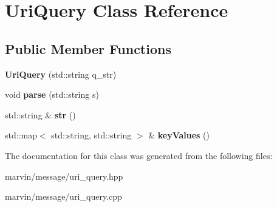 \hypertarget{class_uri_query}{}\section{Uri\+Query Class Reference}
\label{class_uri_query}
\subsection*{Public Member Functions}
\begin{DoxyCompactItemize}
\item 
\mbox{\label{class_uri_query_a312cab0b9f2e254524ebe10e1c8e4315}} 
{\bfseries Uri\+Query} (std\+::string q\+\_\+str)
\item 
\mbox{\label{class_uri_query_a8256a0db97478d0573c01ba42f0a47f4}} 
void {\bfseries parse} (std\+::string s)
\item 
\mbox{\label{class_uri_query_ac865497506e613143548d7d4c1a6f49e}} 
std\+::string \& {\bfseries str} ()
\item 
\mbox{\label{class_uri_query_a60c9ffd3f4336b57ca7aae3242c59157}} 
std\+::map$<$ std\+::string, std\+::string $>$ \& {\bfseries key\+Values} ()
\end{DoxyCompactItemize}


The documentation for this class was generated from the following files\+:\begin{DoxyCompactItemize}
\item 
marvin/message/uri\+\_\+query.\+hpp\item 
marvin/message/uri\+\_\+query.\+cpp\end{DoxyCompactItemize}

